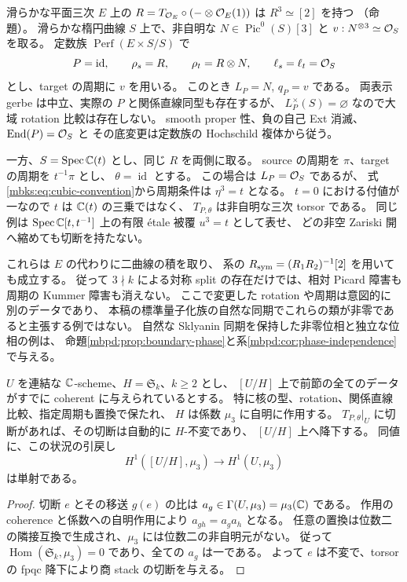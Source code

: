 \begin{example}
\label{mbks:ex:picard-unit}
滑らかな平面三次 $E$ 上の
$R=T_{\mathcal O_E}\circ(-\otimes\mathcal O_E(1))$ は $R^3\simeq[2]$ を持つ
（命題）。
滑らかな楕円曲線 $S$ 上で、非自明な $N\in\operatorname{Pic}^0(S)[3]$ と
$v:N^{\otimes3}\simeq\mathcal O_S$ を取る。
定数族 $\operatorname{Perf}(E\times S/S)$ で
\[
 P=\operatorname{id},\qquad \rho_s=R,\qquad \rho_t=R\otimes N,\qquad
 \ell_s=\ell_t=\mathcal O_S
\]
とし、target の周期に $v$ を用いる。
このとき $L_P=N$, $q_P=v$ である。
両表示 gerbe は中立、実際の $P$ と関係直線同型も存在するが、
$L_P^\times(S)=\varnothing$ なので大域 rotation 比較は存在しない。
smooth proper 性、負の自己 Ext 消滅、$\operatorname{End}(P)=\mathcal O_S$ と
その底変更は定数族の Hochschild 複体から従う。

一方、$S=\operatorname{Spec}\mathbb C(t)$ とし、同じ $R$ を両側に取る。
source の周期を $\pi$、target の周期を $t^{-1}\pi$ とし、
$\theta=\operatorname{id}$ とする。
この場合は $L_P=\mathcal O_S$ であるが、
式\eqref{mbks:eq:cubic-convention}から周期条件は $\eta^3=t$ となる。
$t=0$ における付値が一なので $t$ は $\mathbb C(t)$ の三乗ではなく、
$T_{P,\theta}$ は非自明な三次 torsor である。
同じ例は $\operatorname{Spec}\mathbb C[t,t^{-1}]$ 上の有限 \'etale 被覆 $u^3=t$ として表せ、
どの非空 Zariski 開へ縮めても切断を持たない。

これらは $E$ の代わりに二曲線の積を取り、
系の
$R_{\rm sym}=(R_1R_2)^{-1}[2]$ を用いても成立する。
従って $3\nmid k$ による対称 split の存在だけでは、相対 Picard 障害も
周期の Kummer 障害も消えない。
ここで変更した rotation や周期は意図的に別のデータであり、
本稿の標準量子化族の自然な同期でこれらの類が非零であると主張する例ではない。
自然な Sklyanin 同期を保持した非零位相と独立な位相の例は、
命題\ref{mbpd:prop:boundary-phase}と系\ref{mbpd:cor:phase-independence}で与える。
\end{example}

\begin{proposition}[整合した置換作用の下での位相切断]
\label{mbks:prop:permutation-phase}
$U$ を連結な $\mathbb C$-scheme、$H=\mathfrak S_k$、$k\ge2$ とし、
$[U/H]$ 上で前節の全てのデータがすでに coherent に与えられているとする。
特に核の型、rotation、関係直線比較、指定周期も置換で保たれ、
$H$ は係数 $\mu_3$ に自明に作用する。
$T_{P,\theta}|_U$ に切断があれば、その切断は自動的に $H$-不変であり、
$[U/H]$ 上へ降下する。
同値に、この状況の引戻し
\[
 H^1([U/H],\mu_3)\longrightarrow H^1(U,\mu_3)
\]
は単射である。
\end{proposition}
\begin{proof}
切断 $e$ とその移送 $g(e)$ の比は
$a_g\in\Gamma(U,\mu_3)=\mu_3(\mathbb C)$ である。
作用の coherence と係数への自明作用により
$a_{gh}=a_ga_h$ となる。
任意の置換は位数二の隣接互換で生成され、$\mu_3$ には位数二の非自明元がない。
従って $\operatorname{Hom}(\mathfrak S_k,\mu_3)=0$ であり、全ての $a_g$ は一である。
よって $e$ は不変で、torsor の fpqc 降下により商 stack の切断を与える。
\end{proof}

